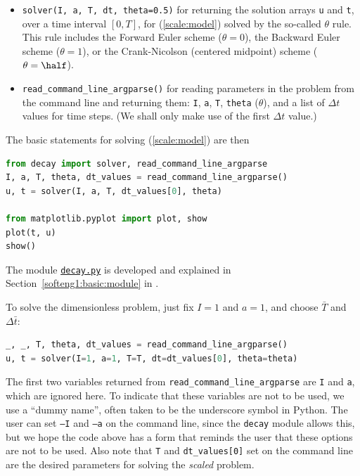 \documentclass[graybox,envcountchap,sectrefs,final]{svmonodo}
\begin{document}
\begin{itemize}
  \item \texttt{solver(I, a, T, dt, theta=0.5)} for returning the solution arrays
    \texttt{u} and \texttt{t}, over a time interval $[0,T]$,
    for (\ref{scale:model}) solved by the so-called
    $\theta$ rule. This rule includes the Forward Euler scheme ($\theta=0$),
    the Backward Euler scheme ($\theta=1$), or the Crank-Nicolson
    (centered midpoint) scheme ($\theta=\half$).

  \item \Verb!read_command_line_argparse()! for reading parameters in the problem
    from the command line and returning them: \texttt{I}, \texttt{a}, \texttt{T}, \texttt{theta} ($\theta$),
    and a list of $\Delta t$ values for time steps. (We shall only make
    use of the first $\Delta t$ value.)
\end{itemize}

\noindent
The basic statements for solving (\ref{scale:model}) are
then

\begin{lstlisting}[language=Python,style=graycolor]
from decay import solver, read_command_line_argparse
I, a, T, theta, dt_values = read_command_line_argparse()
u, t = solver(I, a, T, dt_values[0], theta)

from matplotlib.pyplot import plot, show
plot(t, u)
show()
\end{lstlisting}
The module \href{{http://tinyurl.com/o8pb3yy/decay.py}}{\nolinkurl{decay.py}} is developed
and explained in
Section~\ref{softeng1:basic:module} in \cite{Langtangen_decay}.

To solve the dimensionless problem, just fix $I=1$ and $a=1$,
and choose $\bar T$ and $\Delta\bar t$:

\begin{lstlisting}[language=Python,style=graycolor]
_, _, T, theta, dt_values = read_command_line_argparse()
u, t = solver(I=1, a=1, T=T, dt=dt_values[0], theta=theta)
\end{lstlisting}
The first two variables returned from \Verb!read_command_line_argparse!
are \texttt{I} and \texttt{a}, which are ignored here. To indicate that these
variables are not to be used, we use a
``dummy name'', often taken to be the underscore symbol in
Python. The user can set \texttt{--I} and \texttt{--a} on the command line, since
the \texttt{decay} module allows this, but we hope the code above has a form
that reminds the user that these options are not to be used.
Also note that \texttt{T} and \Verb!dt_values[0]! set on the command line are
the desired parameters for solving the \emph{scaled} problem.
\end{document}
